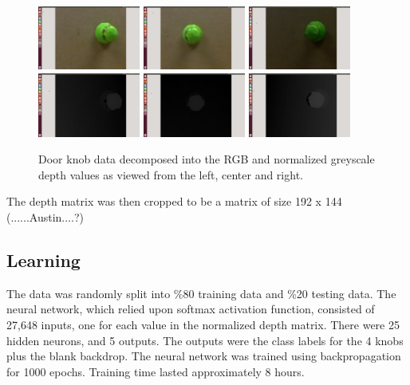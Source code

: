 \documentclass{article}
\begin{document}
\begin{figure}
    \centering
    \includegraphics[width=0.3\textwidth]{DH_RGB_L.png}
    \includegraphics[width=0.3\textwidth]{DH_RGB_C.png}
    \includegraphics[width=0.3\textwidth]{DH_RGB_R.png}
    \includegraphics[width=0.3\textwidth]{DH_D_L.png}
    \includegraphics[width=0.3\textwidth]{DH_D_C.png}
    \includegraphics[width=0.3\textwidth]{DH_D_R.png}
    \caption{Door knob data decomposed into the RGB and normalized greyscale depth values as viewed from the left, center and right.}
    \label{fig:decomposition}
\end{figure}



The depth matrix was then cropped to be a matrix of size 192 x 144 (......Austin....?)

\subsection{Learning}
The data was randomly split into \%80 training data and \%20 testing data. The neural network, which relied upon softmax activation function, consisted of 27,648 inputs, one for each value in the normalized depth matrix.  There were 25 hidden neurons, and 5 outputs. The outputs were the class labels for the 4 knobs plus the blank backdrop.  The neural network was trained using backpropagation for 1000 epochs. Training time lasted approximately 8 hours.
\end{document}
